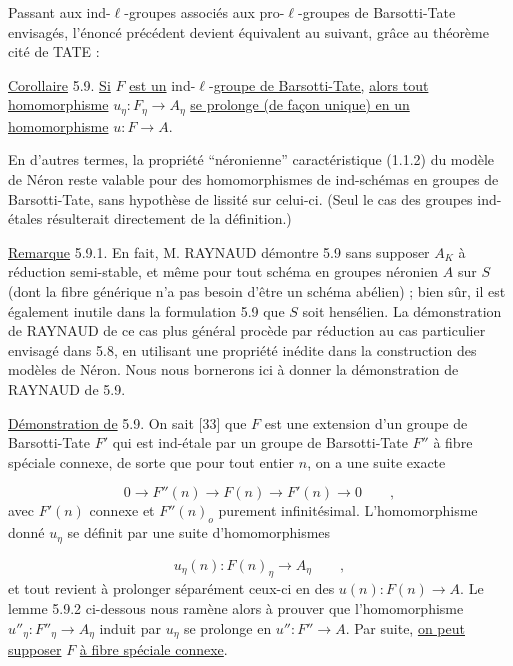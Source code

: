Passant aux ind-$\ell$-groupes associés aux pro-$\ell$-groupes de Barsotti-Tate envisagés, l'énoncé précédent devient équivalent au suivant, grâce au théorème cité de TATE :

\underline{Corollaire} 5.9. \underline{Si} $F$ \underline{est un} ind-$\ell$-\underline{groupe de Barsotti-Tate,} \underline{alors tout} \underline{homomorphisme} $u_\eta : F_\eta \longrightarrow A_\eta$ \underline{se prolonge (de façon unique) en un homomorphisme} $u: F \longrightarrow A$.

En d'autres termes, la propriété ``néronienne'' caractéristique (1.1.2) du modèle de Néron reste valable pour des homomorphismes de ind-schémas en groupes de Barsotti-Tate, sans hypothèse de lissité sur celui-ci. (Seul le cas des groupes ind-étales résulterait directement de la définition.)



\underline{Remarque} 5.9.1.  En fait, M. RAYNAUD démontre 5.9 sans supposer $A_K$ à réduction semi-stable, et même pour tout schéma en groupes néronien $A$ sur $S$ (dont la fibre générique n'a pas besoin d'être un schéma abélien) ; bien sûr, il est également inutile dans la formulation 5.9 que $S$ soit hensélien. La démonstration de RAYNAUD de ce cas plus général procède par réduction au cas particulier envisagé dans 5.8, en utilisant une propriété inédite dans la construction des modèles de Néron. Nous nous bornerons ici à donner la démonstration de RAYNAUD de 5.9.

\underline{Démonstration de} 5.9. On sait [33] que $F$ est une extension d'un groupe de Barsotti-Tate $F'$ qui est ind-étale par un groupe de Barsotti-Tate $F''$ à fibre spéciale connexe, de sorte que pour tout entier $n$, on a une suite exacte

\begin{equation*}
0 \longrightarrow F''(n) \longrightarrow F(n) \longrightarrow F'(n) \longrightarrow 0 \qquad ,
\end{equation*}
avec $F'(n)$ connexe et $F''(n)_o$ purement infinitésimal. L'homomorphisme donné $u_\eta$ se définit par une suite d'homomorphismes

\begin{equation*}
u_\eta(n) : F(n)_\eta \longrightarrow A_\eta \qquad ,
\end{equation*}
et tout revient à prolonger séparément ceux-ci en des $u(n) : F(n) \longrightarrow A$. Le lemme 5.9.2 ci-dessous nous ramène alors à prouver que l'homomorphisme $u''_\eta : F''_\eta \longrightarrow A_\eta$ induit par $u_\eta$ se prolonge en $u'' : F'' \longrightarrow A$. Par suite, \underline{on peut supposer} $F$ \underline{à fibre spéciale connexe}.

